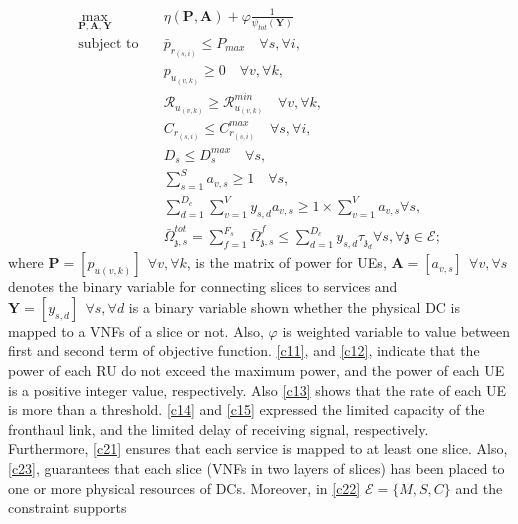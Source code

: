 \documentclass[conference]{IEEEtran}
\begin{document}
\begin{subequations}
\begin{alignat}{4}
\max\limits_{\boldsymbol{P}, \boldsymbol{A}, \boldsymbol{Y} }   \quad &  \eta(\boldsymbol{P},\boldsymbol{A})+ \varphi \frac{1}{\psi_{tot}(\boldsymbol{Y})} \\
\text{subject to} \quad  & \bar{p}_{r_{(s,i)}} \leq P_{max} \quad \forall s, \forall i,
 \label{c11} \\
&p_{u_{(v,k)}}  \geq 0  \quad \forall v, \forall k,\label{c12} \\
&\mathcal{R}_{u_{(v,k)}} \geq  \mathcal{R}_{u_{(v,k)}}^{min} \quad \forall v, \forall k,\label{c13} \\
&C_{r_{(s,i)}} \leq C_{r_{(s,i)}}^{max} \quad \forall s, \forall i, \label{c14}\\
&D_{s} \leq D_{s}^{max} \quad \forall s,\label{c15} \\
& \textstyle  \sum_{s=1}^{S}a_{v,s} \geq 1 \quad \forall s, \label{c21} \\
& \textstyle  \sum_{d=1}^{D_c}\sum_{v=1}^{V}y_{s,d}a_{v,s} \geq 1\times\sum_{v=1}^{V}a_{v,s} \forall s,\label{c23} \\
 &\textstyle  \bar{\Omega}_{\mathfrak{z},s}^{tot} = \sum_{f=1}^{F_s}\bar{\Omega}_{\mathfrak{z},s}^f \leq  \sum_{d=1}^{D_c} y_{s,d} \tau_{\mathfrak{z}_d}  \forall s, \forall \mathfrak{z}\in \mathcal{E}; \label{c22}
\end{alignat}
\label{constraints}
\end{subequations}
where $\boldsymbol{P} =[p_{u(v,k)}] \:\: \forall v , \forall k $, is the matrix of power for UEs, $\boldsymbol{A} =[a_{v,s}] \:\: \forall v , \forall s $ denotes the binary variable for connecting slices to services and $\boldsymbol{Y} =[y_{s,d}]  \:\: \forall s ,  \forall d $ is a binary variable shown whether
the physical DC is mapped to a VNFs of a slice or not.
Also, $\varphi$ is weighted variable to value between first and second term of objective function.
\eqref{c11}, and \eqref{c12}, indicate that the power of each RU do not exceed the maximum power, and the power of each UE is a positive integer value, respectively. Also \eqref{c13} shows that the rate of each UE is more than a threshold. \eqref{c14} and \eqref{c15} expressed the limited capacity of the fronthaul link, and the limited delay of receiving signal, respectively.
Furthermore, \eqref{c21}
ensures that each service is mapped to at least one slice.
Also, \eqref{c23}, guarantees that each slice (VNFs in two layers of slices) has been placed to one or more physical resources of DCs. Moreover, in \eqref{c22}  $\mathcal{E} = \{M,S,C\}$ and the constraint supports
\end{document}
